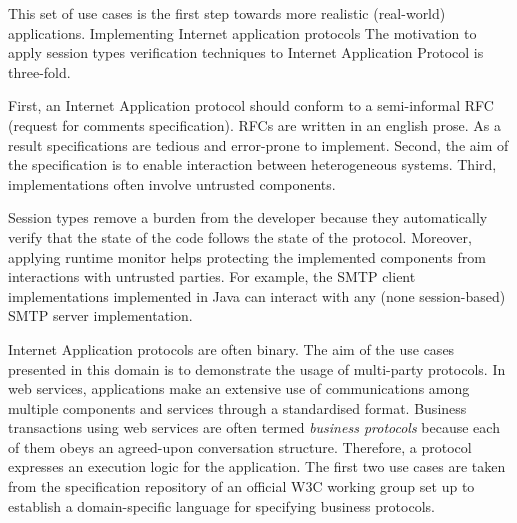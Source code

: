 
This set of use cases is the first step towards more realistic (real-world) applications. 
Implementing Internet application protocols 
The motivation to apply session types verification techniques to Internet Application Protocol is three-fold. 
 
First, an Internet Application protocol should conform to a semi-informal RFC (request for comments specification). 
RFCs are written in an english prose. As a result specifications are tedious  and error-prone to implement. Second,  the aim of the specification is to enable interaction between heterogeneous systems. Third, implementations often involve untrusted components. 

Session types remove a burden from the developer because they automatically verify that the state of the code follows the state of the protocol. 
Moreover, applying runtime monitor helps protecting the implemented components from interactions with untrusted parties. For example, the SMTP client implementations implemented in Java can interact with any (none session-based) SMTP server implementation.   


 
Internet Application protocols are often binary. The aim of the use cases presented in this domain is to demonstrate the usage of multi-party protocols. In web services, applications make an extensive use of communications among multiple components and services through a standardised format. Business transactions using web services
are often termed \textit{business protocols} because each of them obeys an agreed-upon conversation structure.
Therefore, a protocol expresses an execution logic for the application. The first two use cases are taken from the specification repository of an official W3C working group set up to establish a domain-specific language for specifying business protocols. 
 
